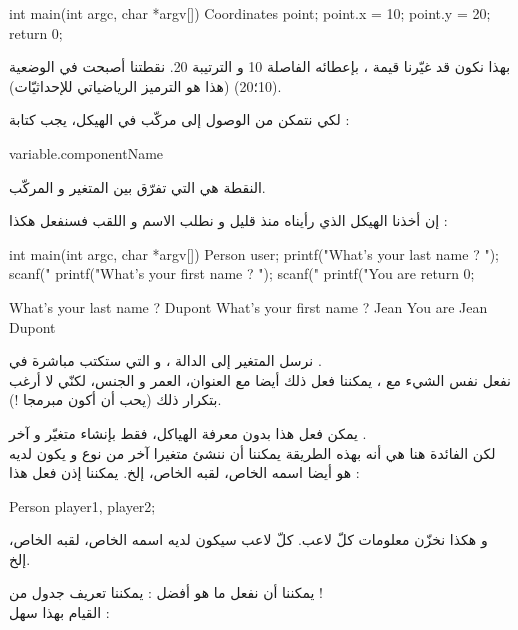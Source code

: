 \begin{Csource}
int main(int argc, char *argv[])
{
	Coordinates point;
	point.x = 10;
	point.y = 20;
	return 0;
}
\end{Csource}

بهذا نكون قد غيّرنا قيمة
،
بإعطائه الفاصلة 10 و الترتيبة 20. نقطتنا أصبحت في الوضعية (10؛20) (هذا هو الترميز الرياضياتي للإحداثيّات).

لكي نتمكن من الوصول إلى مركّب في الهيكل، يجب كتابة :

\begin{Csource}
  variable.componentName
\end{Csource}

النقطة هي التي تفرّق بين المتغير و المركّب.

إن أخذنا الهيكل
الذي رأيناه منذ قليل و نطلب الاسم و اللقب فسنفعل هكذا :

\begin{Csource}
int main(int argc, char *argv[])
{
	Person user;
	printf("What's your last name ? ");
	scanf("%
	printf("What's your first name ? ");
	scanf("%
	printf("You are %
	return 0;
}
\end{Csource}

\begin{Console}
What's your last name ? Dupont
What's your first name ? Jean
You are Jean Dupont
\end{Console}

نرسل المتغير
إلى الدالة
،
و التي ستكتب مباشرة في
.\\
نفعل نفس الشيء مع
،
يمكننا فعل ذلك أيضا مع العنوان، العمر و الجنس، لكنّي لا أرغب بتكرار ذلك (يحب أن أكون مبرمجا !).

يمكن فعل هذا بدون معرفة الهياكل، فقط بإنشاء متغيّر
و آخر
.\\
لكن الفائدة هنا هي أنه بهذه الطريقة يمكننا أن ننشئ متغيرا آخر من نوع
و يكون لديه هو أيضا اسمه الخاص، لقبه الخاص، إلخ. يمكننا إذن فعل هذا :

\begin{Csource}
Person player1, player2;
\end{Csource}

و هكذا نخزّن معلومات كلّ لاعب. كلّ لاعب سيكون لديه اسمه الخاص، لقبه الخاص، إلخ.

يمكننا أن نفعل ما هو أفضل : يمكننا تعريف جدول من
 !\\
القيام بهذا سهل :

